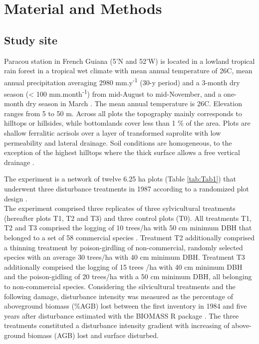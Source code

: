 \documentclass[fleqn,10pt]{ArtEcoFoG} %
\begin{document}
\section{Material and Methods}\label{material-and-methods}

\subsection{Study site}\label{study-site}

Paracou station in French Guiana (5'N and
52'W) is located in a lowland tropical rain forest in a
tropical wet climate with mean annual temperature of 26\textdegree C,
mean annual precipitation averaging 2980 mm.y\textsuperscript{-1} (30-y
period) and a 3-month dry season (\textless{} 100
mm.month\textsuperscript{-1}) from mid-August to mid-November, and a
one-month dry season in March \citep{Wagner2011}. The mean annual
temperature is 26\textdegree C. Elevation ranges from 5 to 50 m. Across
all plots the topography mainly corresponds to hilltops or hillsides,
while bottomlands cover less than 1 \% of the area. Plots are shallow
ferralitic acrisols over a layer of transformed saprolite with low
permeability and lateral drainage. Soil conditions are homogeneous, to
the exception of the highest hilltops where the thick surface allows a
free vertical drainage \citep{Gourlet-Fleury2004}.

The experiment is a network of twelve 6.25 ha plots (Table
\ref{tab:Tab1}) that underwent three disturbance treatments in 1987
according to a randomized plot design \citep{Gourlet-Fleury2004}.\\
The experiment comprised three replicates of three sylvicultural
treatments (hereafter plots T1, T2 and T3) and three control plots (T0).
All treatments T1, T2 and T3 comprised the logging of 10 trees/ha with
50 cm minimum DBH that belonged to a set of 58 commercial species
\citep{Gourlet-Fleury2004}. Treatment T2 additionally comprised a
thinning treatment by poison-girdling of non-commercial, randomly
selected species with an average 30 trees/ha with 40 cm minimum DBH.
Treatment T3 additionally comprised the logging of 15 trees /ha with 40
cm minimum DBH and the poison-gidling of 20 trees/ha with a 50 cm
minimum DBH, all belonging to non-commercial species. Considering the
silvicultural treatments and the following damage, disturbance intensity
was measured as the percentage of aboveground biomass (\%AGB) lost
between the first inventory in 1984 and five years after disturbance
\citep{Piponiot2016} estimated with the BIOMASS R package
\citep{Biomass2018}. The three treatments constituted a disturbance
intensity gradient with increasing of above-ground biomass (AGB) lost
and surface disturbed.
\end{document}
